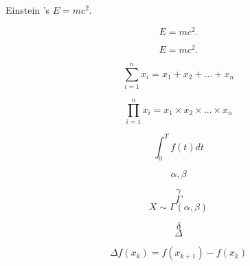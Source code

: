 \documentclass[UTF8]{ctexart}
\begin{document}
Einstein 's $E=mc^2$.

\[ E=mc^2. \]

\begin{equation}
E=mc^2.
\end{equation}

\[ \sum\limits_{i = 1}^{n} x_i = x_1 + x_2 + \dots + x_n\]

\[ \prod\limits_{i = 1}^{n} x_i = x_1 \times x_2 \times \dots \times x_n\]

\[ \int_{0}^{T}f(t)dt\]

\[ \alpha,\beta \]

\[ \gamma \]
\[ \Gamma \]
\[ X \sim \Gamma (\alpha,\beta) \]

\[ \delta \]
\[ \Delta \]

\[ \Delta f(x_k) = f(x_{k+1}) - f(x_k) \]
\end{document}
